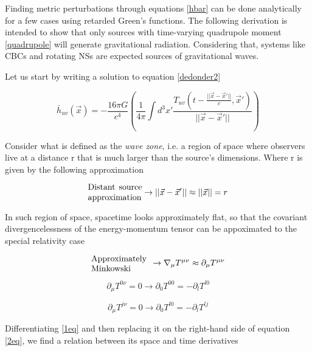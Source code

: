 Finding metric perturbations through equations \ref{hbar} can be done analytically for a few cases using retarded Green's functions. The following derivation is intended to show that only sources with time-varying quadrupole moment \ref{quadrupole} will generate gravitational radiation\cite{Hartle:2021pel,Creighton:2011zz}. Considering that, systems like CBCs and rotating NSs are expected sources of gravitational waves.

Let us start by writing a solution to equation \ref{dedonder2}

\begin{equation}\label{pert.int}
\bar{h}_{uv}(\vec{x}) = -\frac{16\pi G}{c^4} \left( \frac{1}{4\pi} \int d^3x' \frac{T_{uv} \left( t - \frac{|| \vec{x}-\vec{x}' ||}{c} , \vec{x}' \right)  }{|| \vec{x}-\vec{x}' ||} \right)
\end{equation}


Consider what is defined as the \textit{wave zone}, i.e. a region of space where observers live at a distance r that is much larger than the source's dimensions.  Where r is given by the following approximation 

\begin{equation}
\parbox{6.4em}{Distant source approximation}  \rightarrow || \vec{x} - \vec{x}'|| \approx || \vec{x} || = r
\end{equation}

In such region of space, spacetime looks approximately flat, so that the covariant divergencelessness of the energy-momentum tensor can be appoximated to the special relativity case


\begin{equation}
\parbox{6.4em}{Approximately Minkowski} \hspace{2mm} \rightarrow \nabla_{\mu} T^{\mu \nu} \approx \partial_\mu T^{\mu \nu}
\end{equation}

\begin{equation}\label{1eq}
\partial_{\mu} T^{0 \nu} = 0 \rightarrow \partial_{0} T^{0 0} = -\partial_{l} T^{l 0}
\end{equation}

\begin{equation}\label{2eq}
\partial_{\mu} T^{j \nu} = 0 \rightarrow \partial_{0} T^{l 0} = -\partial_{l} T^{l j}
\end{equation}

Differentiating \ref{1eq} and then replacing it on the right-hand side of equation \ref{2eq}, we find a relation between its space and time derivatives 

